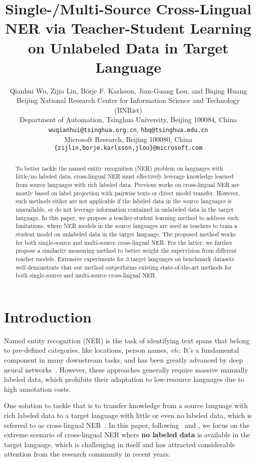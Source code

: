 \documentclass[11pt,a4paper]{article}
\title{Single-/Multi-Source Cross-Lingual NER via Teacher-Student Learning on Unlabeled Data in Target Language}
\author{Qianhui Wu, Zijia Lin, B\"orje F. Karlsson, Jian-Guang Lou, and Biqing Huang \\
	Beijing National Research Center for Information Science and Technology (BNRist) \\
	Department of Automation, Tsinghua University, Beijing 100084, China \\
	\texttt{wuqianhui@tsinghua.org.cn}, \texttt{hbq@tsinghua.edu.cn} \\
	Microsoft Research, Beijing 100080, China \\
	\texttt{\{zijlin,borje.karlsson,jlou\}@microsoft.com} 
}
\date{}
\newcommand\etc{\textit{etc}}
\begin{document}
	\maketitle
	\begin{abstract}
		To better tackle the named entity recognition (NER) problem on languages with little/no labeled data, cross-lingual NER must effectively leverage knowledge learned from source languages with rich labeled data. 
		Previous works on cross-lingual NER are mostly based on label projection with pairwise texts or direct model transfer. 
		However, such methods either are not applicable if the labeled data in the source languages is unavailable, or do not leverage information contained in unlabeled data in the target language.
In this paper, we propose a teacher-student learning method to address such limitations, where NER models in the source languages are used as teachers to train a student model on unlabeled data in the target language. The proposed method works for both single-source and multi-source cross-lingual NER. 
		For the latter, we further propose a similarity measuring method to better weight the supervision from different teacher models. 
		Extensive experiments for 3 target languages on benchmark datasets well demonstrate that our method outperforms existing state-of-the-art methods for both single-source and multi-source cross-lingual NER.
	\end{abstract}
	
	
	\section{Introduction}
	Named entity recognition (NER) is the task of identifying text spans that belong to pre-defined categories, like locations, person names, \etc. 
	It's a fundamental component in many downstream tasks, and has been greatly advanced by deep neural networks~\cite{lample2016neural,chiu2016named,peters2017semi}.
	However, these approaches generally require massive manually labeled data, which prohibits their adaptation to low-resource languages due to high annotation costs. 
	
	One solution to tackle that is to transfer knowledge from a source language with rich labeled data to a target language with little or even no labeled data, which is referred to as cross-lingual NER~\cite{wu2019beto,wu2020enhanced}.
	In this paper, following~\citet{wu2019beto} and \citet{wu2020enhanced}, we focus on the extreme scenario of cross-lingual NER where \textbf{no labeled data} is available in the target language, which is challenging in itself and has attracted considerable attention from the research community in recent years.
	
\end{document}
